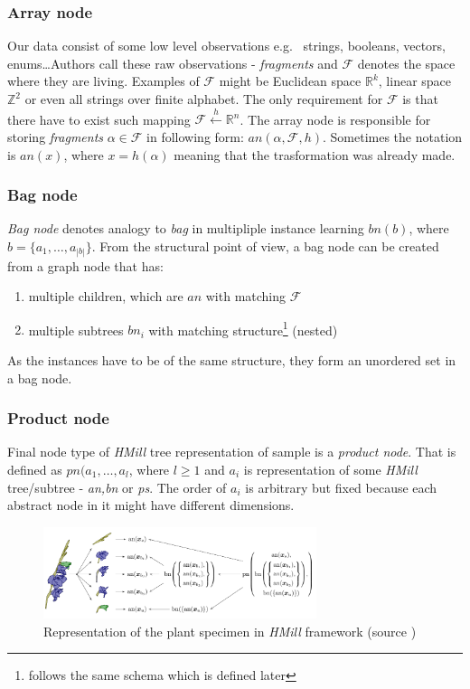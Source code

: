\subsubsection{Array node}
Our data consist of some low level observations e.g. \ strings, booleans, vectors, enums\dots Authors call these raw observations - \emph{fragments} and $\mathcal{F}$ denotes the space where they are living. Examples of $\mathcal{F}$ might be Euclidean space $\mathbb{R}^{k}$, linear space $\mathbb{Z}^{2}$ or even all strings over finite alphabet. The only requirement for $\mathcal{F}$ is that there have to exist such mapping $\mathcal{F}\xleftarrow{h}\mathbb{R}^{n}$. The array node is responsible for storing \emph{fragments} $\alpha\in\mathcal{F}$ in following form: $an(\alpha,\mathcal{F},h)$. Sometimes the notation is $an(x)$, where $x=h(\alpha)$ meaning that the trasformation was already made.

\subsubsection{Bag node}
\emph{Bag node} denotes analogy to \emph{bag} in multipliple instance learning $bn(b)$, where $b=\{a_1,\dots,a_{|b|}\}$. 
From the structural point of view, a bag node can be created from a graph node that has:
\begin{enumerate}
	\item multiple children, which are $an$ with matching $\mathcal{F}$
	\item multiple subtrees $bn_i$ with matching structure\footnote{follows the same schema which is defined later} (nested)
\end{enumerate}
As the instances have to be of the same structure, they form an unordered set in a bag node.

\subsubsection{Product node}
Final node type of \emph{HMill} tree representation of sample is a \emph{product node}. That is defined as $pn(a_1,\dots,a_{l}$, where $l\geq1$ and $a_i$ is representation of some \emph{HMill} tree/subtree - \emph{an,bn} or \emph{ps}. The order of $a_i$ is arbitrary but fixed because each abstract node in it might have different dimensions.

\begin{figure}[h]
    \centering
    \includegraphics[width=8cm]{figures/irismill.png}
    \caption{Representation of the plant specimen in \emph{HMill} framework (source \cite{Mandlik2020})}
    \label{fig:irismill}
\end{figure}

